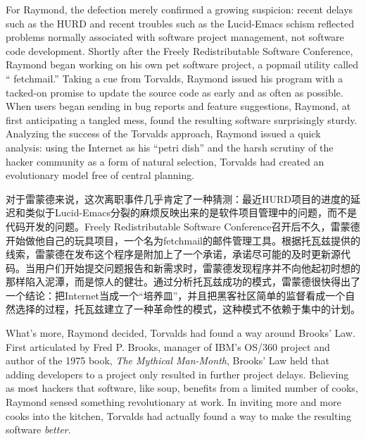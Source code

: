 
\ifdefined\eng
For Raymond, the defection merely confirmed a growing suspicion: recent delays such as the HURD and recent troubles such as the Lucid-Emacs schism reflected problems normally associated with software project management, not software code development. Shortly after the Freely Redistributable Software Conference, Raymond began working on his own pet software project, a popmail utility called `` fetchmail.'' Taking a cue from Torvalds, Raymond issued his program with a tacked-on promise to update the source code as early and as often as possible. When users began sending in bug reports and feature suggestions, Raymond, at first anticipating a tangled mess, found the resulting software surprisingly sturdy. Analyzing the success of the Torvalds approach, Raymond issued a quick analysis: using the Internet as his ``petri dish'' and the harsh scrutiny of the hacker community as a form of natural selection, Torvalds had created an evolutionary model free of central planning.
\fi

\ifdefined\chs
对于雷蒙德来说，这次离职事件几乎肯定了一种猜测：最近HURD项目的进度的延迟和类似于Lucid-Emacs分裂的麻烦反映出来的是软件项目管理中的问题，而不是代码开发的问题。Freely Redistributable Software Conference召开后不久，雷蒙德开始做他自己的玩具项目，一个名为fetchmail的邮件管理工具。根据托瓦兹提供的线索，雷蒙德在发布这个程序是附加上了一个承诺，承诺尽可能的及时更新源代码。当用户们开始提交问题报告和新需求时，雷蒙德发现程序并不向他起初时想的那样陷入泥潭，而是惊人的健壮。通过分析托瓦兹成功的模式，雷蒙德很快得出了一个结论：把Internet当成一个“培养皿”，并且把黑客社区简单的监督看成一个自然选择的过程，托瓦兹建立了一种革命性的模式，这种模式不依赖于集中的计划。
\fi

\ifdefined\eng
What's more, Raymond decided, Torvalds had found a way around Brooks' Law. First articulated by Fred P. Brooks, manager of IBM's OS/360 project and author of the 1975 book, \textit{The Mythical Man-Month}, Brooks' Law held that adding developers to a project only resulted in further project delays. Believing as most hackers that software, like soup, benefits from a limited number of cooks, Raymond sensed something revolutionary at work. In inviting more and more cooks into the kitchen, Torvalds had actually found a way to make the resulting software \textit{better}.
\fi


